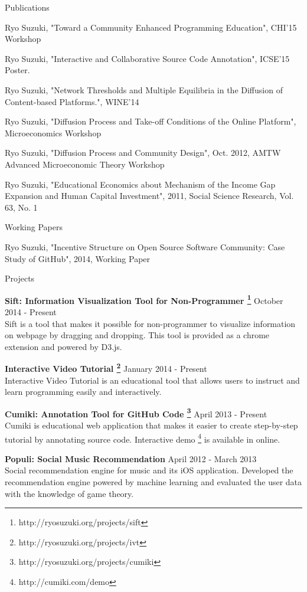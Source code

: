 \documentclass{resume} %
\begin{document}
\begin{rSection}{Publications}

Ryo Suzuki, "Toward a Community Enhanced Programming Education", CHI'15 Workshop

Ryo Suzuki, "Interactive and Collaborative Source Code Annotation", ICSE'15 Poster.

Ryo Suzuki, "Network Thresholds and Multiple Equilibria in the Diffusion of Content-based Platforms.", WINE'14

Ryo Suzuki, "Diffusion Process and Take-off Conditions of the Online Platform", Microeconomics Workshop

Ryo Suzuki, "Diffusion Process and Community Design", Oct. 2012, AMTW Advanced Microeconomic Theory Workshop

Ryo Suzuki, "Educational Economics about Mechanism of the Income Gap Expansion and Human Capital Investment", 2011, Social Science Research, Vol. 63, No. 1
\\
\end{rSection}

\begin{rSection}{Working Papers}

Ryo Suzuki, "Incentive Structure on Open Source Software Community: Case Study of GitHub", 2014, Working Paper

\end{rSection}


\begin{rSection}{Projects}

{\bf Sift: Information Visualization Tool for Non-Programmer \footnote{http://ryosuzuki.org/projects/sift} } \hfill {October 2014 - Present} \\
Sift is a tool that makes it possible for non-programmer to visualize information on webpage by dragging and dropping. This tool is provided as a chrome extension and powered by D3.js.

{\bf Interactive Video Tutorial \footnote{http://ryosuzuki.org/projects/ivt} } \hfill {January 2014 - Present} \\
Interactive Video Tutorial is an educational tool that allows users to instruct and learn programming easily and interactively.

{\bf Cumiki: Annotation Tool for GitHub Code \footnote{http://ryosuzuki.org/projects/cumiki} } \hfill {April 2013 - Present} \\
Cumiki is educational web application that makes it easier to create step-by-step tutorial by annotating source code.
Interactive demo \footnote{http://cumiki.com/demo} is available in online.

{\bf Populi: Social Music Recommendation} \hfill {April 2012 - March 2013} \\
Social recommendation engine for music and its iOS application.
Developed the recommendation engine powered by machine learning and evaluated the user data with the knowledge of game theory.

\end{rSection}
\end{document}
